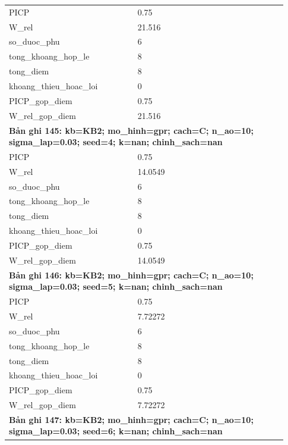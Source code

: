 \begin{longtable}{p{0.43\linewidth}p{0.50\linewidth}}
PICP & 0.75 \\
W\_\allowbreak rel & 21.516 \\
so\_\allowbreak duoc\_\allowbreak phu & 6 \\
tong\_\allowbreak khoang\_\allowbreak hop\_\allowbreak le & 8 \\
tong\_\allowbreak diem & 8 \\
khoang\_\allowbreak thieu\_\allowbreak hoac\_\allowbreak loi & 0 \\
PICP\_\allowbreak gop\_\allowbreak diem & 0.75 \\
W\_\allowbreak rel\_\allowbreak gop\_\allowbreak diem & 21.516 \\
\midrule
\multicolumn{2}{p{0.95\linewidth}}{\textbf{Bản ghi 145: kb=KB2; mo\_hinh=gpr; cach=C; n\_ao=10; sigma\_lap=0.03; seed=4; k=nan; chinh\_sach=nan}} \\
PICP & 0.75 \\
W\_\allowbreak rel & 14.0549 \\
so\_\allowbreak duoc\_\allowbreak phu & 6 \\
tong\_\allowbreak khoang\_\allowbreak hop\_\allowbreak le & 8 \\
tong\_\allowbreak diem & 8 \\
khoang\_\allowbreak thieu\_\allowbreak hoac\_\allowbreak loi & 0 \\
PICP\_\allowbreak gop\_\allowbreak diem & 0.75 \\
W\_\allowbreak rel\_\allowbreak gop\_\allowbreak diem & 14.0549 \\
\midrule
\multicolumn{2}{p{0.95\linewidth}}{\textbf{Bản ghi 146: kb=KB2; mo\_hinh=gpr; cach=C; n\_ao=10; sigma\_lap=0.03; seed=5; k=nan; chinh\_sach=nan}} \\
PICP & 0.75 \\
W\_\allowbreak rel & 7.72272 \\
so\_\allowbreak duoc\_\allowbreak phu & 6 \\
tong\_\allowbreak khoang\_\allowbreak hop\_\allowbreak le & 8 \\
tong\_\allowbreak diem & 8 \\
khoang\_\allowbreak thieu\_\allowbreak hoac\_\allowbreak loi & 0 \\
PICP\_\allowbreak gop\_\allowbreak diem & 0.75 \\
W\_\allowbreak rel\_\allowbreak gop\_\allowbreak diem & 7.72272 \\
\midrule
\multicolumn{2}{p{0.95\linewidth}}{\textbf{Bản ghi 147: kb=KB2; mo\_hinh=gpr; cach=C; n\_ao=10; sigma\_lap=0.03; seed=6; k=nan; chinh\_sach=nan}} \\

\end{longtable}
